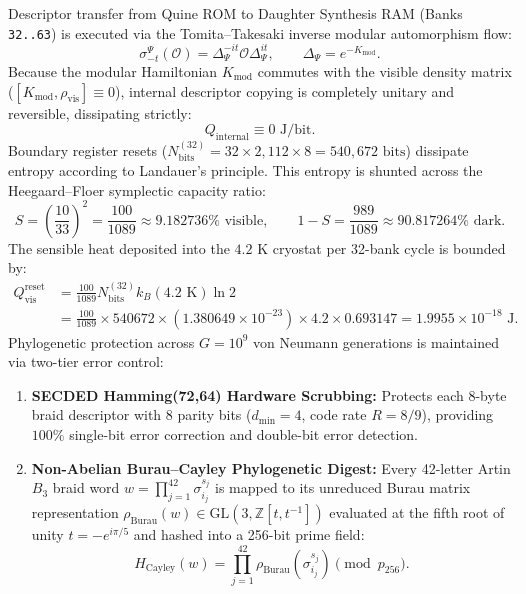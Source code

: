 \documentclass[11pt,onecolumn]{article}
\begin{document}
Descriptor transfer from Quine ROM to Daughter Synthesis RAM (Banks \texttt{32..63}) is executed via the Tomita--Takesaki inverse modular automorphism flow:
\begin{equation}
\sigma_{-t}^\Psi(\mathcal{O}) = \Delta_\Psi^{-it} \mathcal{O} \Delta_\Psi^{it}, \qquad \Delta_\Psi = e^{-K_{\text{mod}}}.
\label{eq:tomita_modular_flow}
\end{equation}
Because the modular Hamiltonian $K_{\text{mod}}$ commutes with the visible density matrix ($[K_{\text{mod}}, \rho_{\text{vis}}] \equiv 0$), internal descriptor copying is completely unitary and reversible, dissipating strictly:
\begin{equation}
Q_{\text{internal}} \equiv 0\text{ J/bit}.
\label{eq:zero_internal_dissipation}
\end{equation}
Boundary register resets ($N_{\text{bits}}^{(32)} = 32 \times 2{,}112 \times 8 = 540{,}672\text{ bits}$) dissipate entropy according to Landauer's principle. This entropy is shunted across the Heegaard--Floer symplectic capacity ratio:
\begin{equation}
S = \left(\frac{10}{33}\right)^2 = \frac{100}{1089} \approx 9.182736\% \text{ visible}, \qquad 1 - S = \frac{989}{1089} \approx 90.817264\% \text{ dark}.
\label{eq:hf_symplectic_ratio}
\end{equation}
The sensible heat deposited into the $4.2\text{ K}$ cryostat per 32-bank cycle is bounded by:
\begin{equation}
\begin{split}
Q_{\text{vis}}^{\text{reset}} &= \frac{100}{1089} N_{\text{bits}}^{(32)} k_B (4.2\text{ K}) \ln 2 \\
&= \frac{100}{1089} \times 540672 \times (1.380649 \times 10^{-23}) \times 4.2 \times 0.693147 = 1.9955 \times 10^{-18}\text{ J}.
\end{split}
\label{eq:q_vis_reset}
\end{equation}
Phylogenetic protection across $G = 10^9$ von Neumann generations is maintained via two-tier error control:
\begin{enumerate}
    \item \textbf{SECDED Hamming(72,64) Hardware Scrubbing:} Protects each 8-byte braid descriptor with 8 parity bits ($d_{\min} = 4$, code rate $R = 8/9$), providing $100\%$ single-bit error correction and double-bit error detection.
    \item \textbf{Non-Abelian Burau--Cayley Phylogenetic Digest:} Every 42-letter Artin $B_3$ braid word $w = \prod_{j=1}^{42} \sigma_{i_j}^{s_j}$ is mapped to its unreduced Burau matrix representation $\rho_{\text{Burau}}(w) \in \text{GL}(3, \mathbb{Z}[t, t^{-1}])$ evaluated at the fifth root of unity $t = -e^{i\pi/5}$ and hashed into a 256-bit prime field:
    \begin{equation}
    H_{\text{Cayley}}(w) = \prod_{j=1}^{42} \rho_{\text{Burau}}\left(\sigma_{i_j}^{s_j}\right) \pmod{p_{256}}.
    \label{eq:burau_cayley_hash}
    \end{equation}
\end{enumerate}
\end{document}
